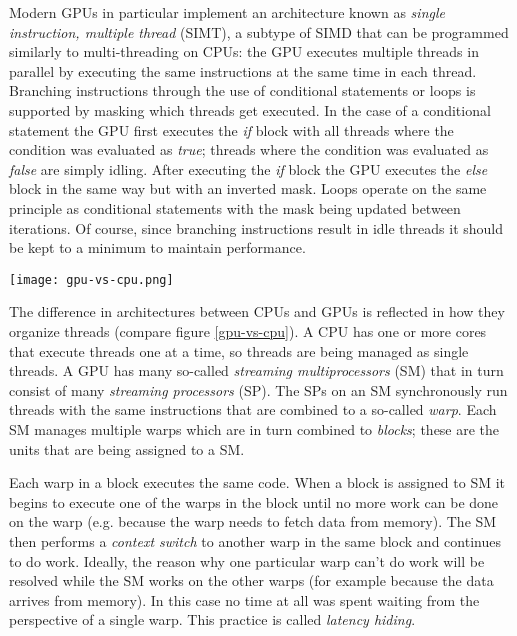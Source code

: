Modern GPUs in particular implement an architecture known as \textit{single instruction, multiple thread} (SIMT),
a subtype of SIMD that can be programmed similarly to multi-threading on CPUs:
the GPU executes multiple threads in parallel by executing the same instructions at the same time in each thread.
Branching instructions through the use of conditional statements or loops is supported by masking which threads get executed.
In the case of a conditional statement the GPU first executes the \textit{if} block with
all threads where the condition was evaluated as \textit{true};
threads where the condition was evaluated as \textit{false} are simply idling.
After executing the \textit{if} block the GPU executes the \textit{else} block in the same way but with an inverted mask.
Loops operate on the same principle as conditional statements with the mask being updated between iterations.
Of course, since branching instructions result in idle threads it should be kept to a minimum to maintain performance.
\begin{figure*}
	\texttt{[image: gpu-vs-cpu.png]}
	\caption{
		Graphical representation of the analogy between hardware and thread model on CPUs and GPUs.
		Each CPU core can work on one thread at a time so threads are managed individually.
		Each SM can work on multiple threads at once so threads are managed as warps.
		Warps are in turn grouped together as blocks.
	}
	\label{gpu-vs-cpu}
\end{figure*}

The difference in architectures between CPUs and GPUs is reflected in how they organize threads (compare figure \ref{gpu-vs-cpu}).
A CPU has one or more cores that execute threads one at a time, so threads are being managed as single threads.
A GPU has many so-called \textit{streaming multiprocessors} (SM) that in turn consist of many \textit{streaming processors} (SP).
The SPs on an SM synchronously run threads with the same instructions that are combined to a so-called \textit{warp}.
Each SM manages multiple warps which are in turn combined to \textit{blocks};
these are the units that are being assigned to a SM.

Each warp in a block executes the same code.
When a block is assigned to SM it begins to execute one of the warps in the block until no more work can be done on the warp
(e.g. because the warp needs to fetch data from memory).
The SM then performs a \textit{context switch} to another warp in the same block and continues to do work.
Ideally, the reason why one particular warp can't do work will be resolved while the SM works on the other warps
(for example because the data arrives from memory).
In this case no time at all was spent waiting from the perspective of a single warp.
This practice is called \textit{latency hiding}.

